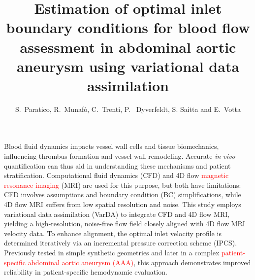 \graphicspath{{chapters/chp1/graphics/}}

\title{Estimation of optimal inlet boundary conditions for blood flow assessment in abdominal aortic aneurysm using variational data assimilation}

\author{S.~Paratico, R.~Munaf\`o, C.~Trenti, P.~ Dyverfeldt, S. Saitta and E.~Votta}

\maketitle

\abstract{}
Blood fluid dynamics impacts vessel wall cells and tissue biomechanics, influencing thrombus formation and vessel wall remodeling. Accurate \textit{in vivo} quantification can thus aid in understanding these mechanisms and patient stratification. Computational fluid dynamics (CFD) and 4D flow \textcolor{red}{magnetic resonance imaging} (MRI) are used for this purpose, but both have limitations: CFD involves assumptions and boundary condition (BC) simplifications, while 4D flow MRI suffers from low spatial resolution and noise. This study employs variational data assimilation (VarDA) to integrate CFD and 4D flow MRI, yielding a high-resolution, noise-free flow field closely aligned with 4D flow MRI velocity data. To enhance alignment, the optimal inlet velocity profile is determined iteratively via an incremental pressure correction scheme (IPCS). Previously tested in simple synthetic geometries and later in a complex  \textcolor{red}{patient-specific abdominal aortic aneurysm (AAA)}, this approach demonstrates improved reliability in patient-specific hemodynamic evaluation. 


